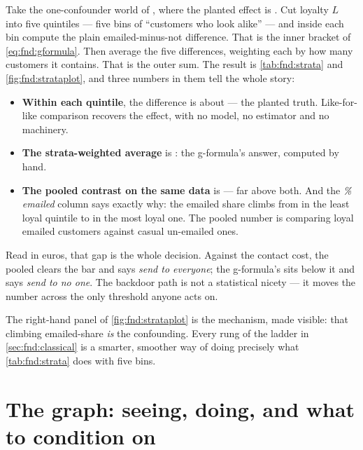 Take the one-confounder world of , where the planted
effect is \eur{\nbZeroTrueDag}. Cut loyalty $L$ into five quintiles --- five bins of
``customers who look alike'' --- and inside each bin compute the plain emailed-minus-not
difference. That is the inner bracket of \cref{eq:fnd:gformula}. Then average the five
differences, weighting each by how many customers it contains. That is the outer sum. The
result is \cref{tab:fnd:strata} and \cref{fig:fnd:strataplot}, and three numbers in them tell
the whole story:

\begin{itemize}[leftmargin=*]
  \item \textbf{Within each quintile}, the difference is about \eur{\nbZeroTrueDag} --- the
        planted truth. Like-for-like comparison recovers the effect, with no model, no
        estimator and no machinery.
  \item \textbf{The strata-weighted average} is \eur{\nbZeroStratAte}: the g-formula's answer,
        computed by hand.
  \item \textbf{The pooled contrast on the same data} is \eur{\nbZeroPooledNaive} --- far above
        both. And the \emph{\% emailed} column says exactly why: the emailed share climbs from
        \pc{\nbZeroStratLoEmailed} in the least loyal quintile to \pc{\nbZeroStratHiEmailed} in
        the most loyal one. The pooled number is comparing loyal emailed customers against
        casual un-emailed ones.
\end{itemize}

Read in euros, that gap is the whole decision. Against the \eur{\nbZeroCost} contact cost, the
pooled \eur{\nbZeroPooledNaive} clears the bar and says \emph{send to everyone}; the g-formula's
\eur{\nbZeroStratAte} sits below it and says \emph{send to no one}. The backdoor path is not a
statistical nicety --- it moves the number across the only threshold anyone acts on.




The right-hand panel of \cref{fig:fnd:strataplot} is the mechanism, made visible: that climbing
emailed-share \emph{is} the confounding. Every rung of the ladder in \cref{sec:fnd:classical} is
a smarter, smoother way of doing precisely what \cref{tab:fnd:strata} does with five bins.

\section{The graph: seeing, doing, and what to condition on}
\label{sec:fnd:collider}

